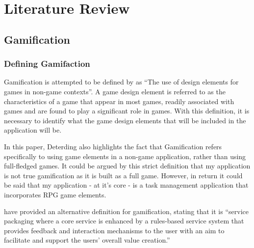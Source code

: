 \chapter{Literature Review}
\label{chap:litReview}

\section{Gamification}
\subsection{Defining Gamifaction}
Gamification is attempted to be defined by \cite{Deterding:2011:GDE:2181037.2181040} as ``The use of design elements for games in non-game contexts''. 
A game design element is referred to as the characteristics of a game that appear in most games, readily associated with games and are found to play a significant role in games.
With this definition, it is necessary to identify what the game design elements that will be included in the application will be. 

In this paper, Deterding also highlights the fact that Gamification refers specifically to using game elements in a non-game application, rather than using full-fledged games.
It could be argued by this strict definition that my application is not true gamification as it is built as a full game.
However, in return it could be said that my application - at it's core - is a task management application that incorporates RPG game elements.

\cite{huotari2011gamification} have provided an alternative definition for gamification, stating that it is ``service packaging where a core service is enhanced by a rules-based service system that provides feedback and interaction mechanisms to the user with an aim to facilitate and support the users’ overall value creation.''


